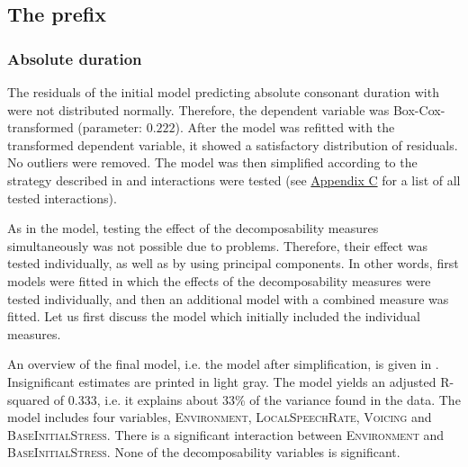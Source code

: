 \subsection{The prefix } \label{corpus results dis}


\subsubsection{Absolute duration}\largerpage

The residuals of the initial model predicting absolute consonant duration with  were not distributed normally. Therefore, the dependent variable was Box-Cox-transformed (parameter:  $0.222$). After the model was refitted with the transformed dependent variable, it showed a satisfactory distribution of residuals. No outliers were removed. The model was then simplified according to the strategy described in   and interactions were tested (see \hyperref[Appendix C: Summaries of tested interactions in corpus study]{Appendix C} for a list of all tested interactions).

As in the model, testing the effect of the decomposability measures simultaneously was not possible due to  problems. Therefore, their effect was tested individually, as well as by using principal components. In other words, first models were fitted in which the effects of the decomposability measures were tested individually, and then an additional model with a combined  measure was fitted. 
 Let us first discuss the model which initially included the individual measures.

An overview of the final model, i.e. the model after simplification, is given in . Insignificant estimates are printed in light gray. The model yields an adjusted R-squared of  0.333, i.e. it explains about 33\% of the variance found in the data. The model includes four variables, \textsc{Environment}, \textsc{LocalSpeechRate}, \textsc{Voicing} and \textsc{BaseInitialStress}. There is a significant interaction between \textsc{Environment} and \textsc{BaseInitialStress}. None of the decomposability variables is significant.\largerpage


